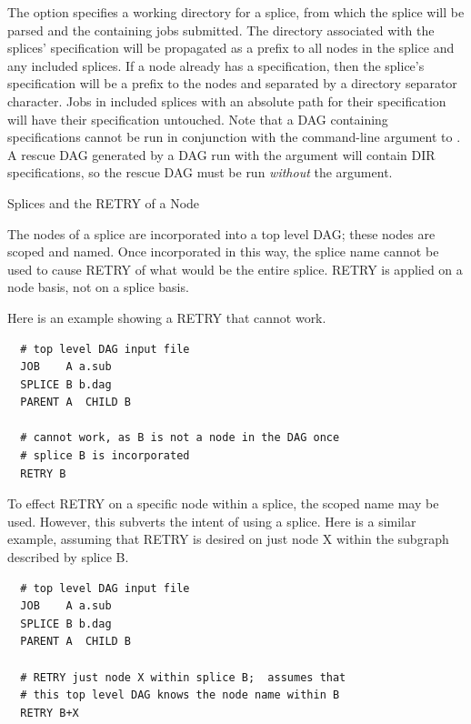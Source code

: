 The  option specifies a working directory for a splice,
from which the splice will be parsed and the containing jobs submitted.
The directory associated with the splices'  specification
will be propagated as a prefix to all nodes in the splice and any 
included splices.
If a node already has a  specification, then the splice's
 specification will be a prefix to the nodes and separated by
a directory separator character.
Jobs in included splices with an absolute path for their 
specification will have their  specification untouched.
Note that a DAG containing  specifications cannot be run
in conjunction with the  command-line argument to
.
A rescue DAG generated by a DAG run with the  argument
will contain DIR specifications, so the rescue DAG must be run
\emph{without} the  argument.


\begin{description}
\item[Splices and the RETRY of a Node]
\end{description}

The nodes of a splice are incorporated into a top level DAG;
these nodes are scoped and named.
Once incorporated in this way, the splice name cannot be used
to cause RETRY of what would be the entire splice.
RETRY is applied on a node basis, not on a splice basis.

Here is an example showing a RETRY that cannot work.
\begin{verbatim}
  # top level DAG input file
  JOB    A a.sub
  SPLICE B b.dag
  PARENT A  CHILD B

  # cannot work, as B is not a node in the DAG once
  # splice B is incorporated
  RETRY B
\end{verbatim}

To effect RETRY on a specific node within a splice,
the scoped name may be used.
However, this subverts the intent of using a splice.
Here is a similar example, assuming that RETRY is desired
on just node X within the subgraph described by splice B.
\begin{verbatim}
  # top level DAG input file
  JOB    A a.sub
  SPLICE B b.dag
  PARENT A  CHILD B

  # RETRY just node X within splice B;  assumes that
  # this top level DAG knows the node name within B
  RETRY B+X
\end{verbatim}


